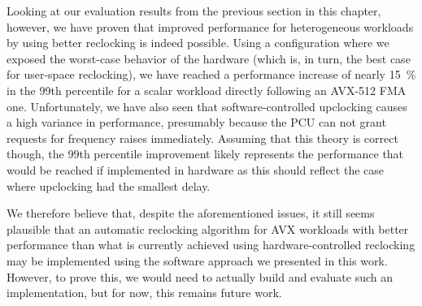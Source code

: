 Looking at our evaluation results from the previous section in this chapter, however, we have proven that improved performance for heterogeneous workloads by using better reclocking is indeed possible. Using a configuration where we exposed the worst-case behavior of the hardware (which is, in turn, the best case for user-space reclocking), we have reached a performance increase of nearly \SI{15}{\percent} in the 99th percentile for a scalar workload directly following an \gls{AVX-512} \gls{FMA} one. Unfortunately, we have also seen that software-controlled upclocking causes a high variance in performance, presumably because the \gls{PCU} can not grant requests for frequency raises immediately. Assuming that this theory is correct though, the 99th percentile improvement likely represents the performance that would be reached if implemented in hardware as this should reflect the case where upclocking had the smallest delay.

We therefore believe that, despite the aforementioned issues, it still seems plausible that an automatic reclocking algorithm for \gls{AVX} workloads with better performance than what is currently achieved using hardware-controlled reclocking may be implemented using the software approach we presented in this work. However, to prove this, we would need to actually build and evaluate such an implementation, but for now, this remains future work.
